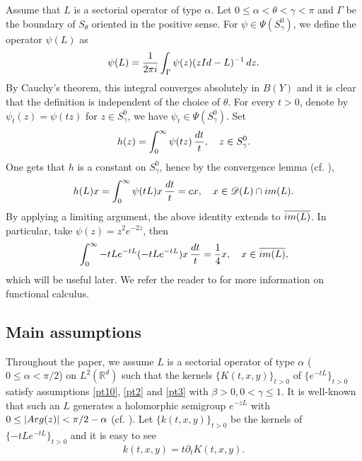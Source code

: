 \documentclass[oneside,english,a4wide]{amsart}
\numberwithin{equation}{section}
\numberwithin{figure}{section}
\theoremstyle{plain}
\theoremstyle{plain}
\theoremstyle{definition}
\theoremstyle{plain}
\theoremstyle{remark}
\theoremstyle{definition}
\theoremstyle{remark}
\theoremstyle{definition}
\newcommand{\real}{{\mathbb R}}
\newcommand{\D}{{\mathscr{D}}}
\newcommand{\8}{+\infty}
\renewcommand{\1}{\mathbbm{1}}
\renewcommand\d{{\rm d}}
\newcommand\Arg{{\rm Arg}}
\begin{document}
Assume that $L$ is a sectorial operator of type $\alpha$. Let $0 \leq \alpha < \theta < \gamma < \pi$ and $\Gamma$ be the boundary of $S_{\theta}$ oriented in the positive sense. For $\psi \in \Psi(S_{\gamma}^0)$, we define the operator $\psi(L)$ as
\[
    \psi(L) = \frac{1}{2\pi i} \int_{\Gamma} \psi(z)(z{\rm Id} - L)^{-1} \,\d z.
\]
By Cauchy's theorem, this integral converges absolutely in $B(Y)$ and it is clear that the definition is independent of the choice of $\theta$.
For every $t > 0$, denote by $\psi_t(z) = \psi(tz)$ for $z \in S_{\gamma}^0$, we have $\psi_t \in \Psi(S_{\gamma}^0) $. Set
\[
    h(z) = \int_0^{\infty} \psi(tz) \,\frac{\d t}{t}, \quad z \in S_{\gamma}^0.
\]
One gets that $h$ is a constant on $S_{\gamma}^0$, hence by the convergence lemma (cf. \cite[Lemma 2.1]{Cowling1996}),
\[
    h(L)x = \int_{0}^{\infty} \psi(tL)x \,\frac{\d t}{t} = cx,\quad x \in \D(L) \cap {\rm im}(L).
\]
By applying a limiting argument, the above identity extends to $\overline{ {\rm im}(L)}$. In particular, take $\psi(z) = z^2e^{-2z}$, then
\begin{equation}\label{funcal1}
    \int_{0}^{\infty} -tLe^{-tL}(-tLe^{-tL})x \,\frac{\d t}{t} = \frac{1}{4}x,\quad x \in \overline{ {\rm im}(L) },
\end{equation}
which will be useful later.  We refer the reader to \cite{Haase2005} for more information on functional calculus.


\subsection{Main assumptions}\label{mainassumption}
Throughout the paper, we assume $L$ is a sectorial operator of type $\alpha$ ($0 \leq \alpha < \pi/2$) on $L^2(\real^d)$ such that the kernels $\{K(t, x,y)\}_{t>0}$ of $\{e^{-tL}\}_{t>0}$ satisfy assumptions \eqref{pt10}, \eqref{pt2} and \eqref{pt3} with $ \beta > 0, 0 < \gamma \leq 1  $. It is well-known that such an $L$ generates a holomorphic semigroup  $e^{-zL}  $ with $0\leq |\Arg(z)| <\pi/2-\alpha$  (cf. \cite[Chapter 3, 3.2]{Haase2005}). Let $\{k(t, x,y)\}_{t>0}$ be the kernels of $\{-tLe^{-tL}\}_{t>0}$ and it is easy to see
\[
    k(t, x, y) = t \partial_tK(t, x, y).
\]
\end{document}
